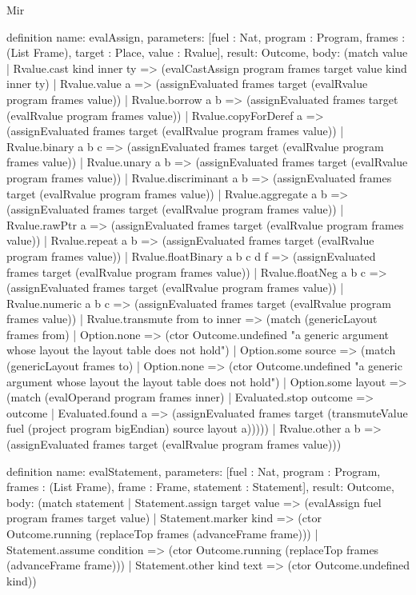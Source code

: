 \begin{lexlean}{Mir}
\begin{semanticmodule}
definition{
  name: evalAssign,
  parameters: [fuel : Nat, program : Program, frames : (List Frame), target : Place, value : Rvalue],
  result: Outcome,
  body: (match value
    | Rvalue.cast kind inner ty => (evalCastAssign program frames target value kind inner ty)
    | Rvalue.value a => (assignEvaluated frames target (evalRvalue program frames value))
    | Rvalue.borrow a b => (assignEvaluated frames target (evalRvalue program frames value))
    | Rvalue.copyForDeref a => (assignEvaluated frames target (evalRvalue program frames value))
    | Rvalue.binary a b c => (assignEvaluated frames target (evalRvalue program frames value))
    | Rvalue.unary a b => (assignEvaluated frames target (evalRvalue program frames value))
    | Rvalue.discriminant a b => (assignEvaluated frames target (evalRvalue program frames value))
    | Rvalue.aggregate a b => (assignEvaluated frames target (evalRvalue program frames value))
    | Rvalue.rawPtr a => (assignEvaluated frames target (evalRvalue program frames value))
    | Rvalue.repeat a b => (assignEvaluated frames target (evalRvalue program frames value))
    | Rvalue.floatBinary a b c d f => (assignEvaluated frames target (evalRvalue program frames value))
    | Rvalue.floatNeg a b c => (assignEvaluated frames target (evalRvalue program frames value))
    | Rvalue.numeric a b c => (assignEvaluated frames target (evalRvalue program frames value))
    | Rvalue.transmute from to inner => (match (genericLayout frames from)
      | Option.none => (ctor Outcome.undefined "a generic argument whose layout the layout table does not hold")
      | Option.some source => (match (genericLayout frames to)
        | Option.none => (ctor Outcome.undefined "a generic argument whose layout the layout table does not hold")
        | Option.some layout => (match (evalOperand program frames inner)
          | Evaluated.stop outcome => outcome
          | Evaluated.found a => (assignEvaluated frames target (transmuteValue fuel (project program bigEndian) source layout a)))))
    | Rvalue.other a b => (assignEvaluated frames target (evalRvalue program frames value)))
}

definition{
  name: evalStatement,
  parameters: [fuel : Nat, program : Program, frames : (List Frame), frame : Frame, statement : Statement],
  result: Outcome,
  body: (match statement
    | Statement.assign target value => (evalAssign fuel program frames target value)
    | Statement.marker kind => (ctor Outcome.running (replaceTop frames (advanceFrame frame)))
    | Statement.assume condition => (ctor Outcome.running (replaceTop frames (advanceFrame frame)))
    | Statement.other kind text => (ctor Outcome.undefined kind))
}


\end{semanticmodule}
\end{lexlean}
